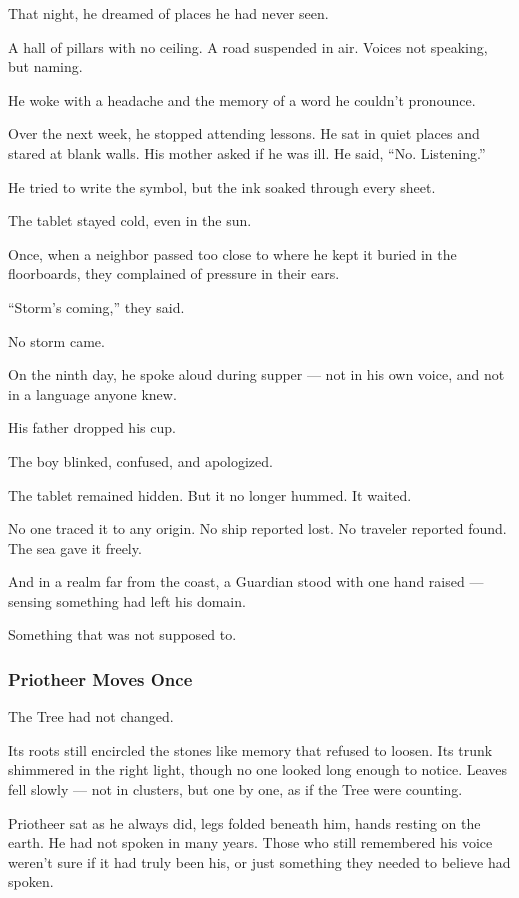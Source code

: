 \documentclass[12pt]{article}
\begin{document}
That night, he dreamed of places he had never seen.

A hall of pillars with no ceiling. A road suspended in air. Voices not speaking, but naming.

He woke with a headache and the memory of a word he couldn’t pronounce.

Over the next week, he stopped attending lessons. He sat in quiet places and stared at blank walls. His mother asked if he was ill. He said, ``No. Listening.''

He tried to write the symbol, but the ink soaked through every sheet.

The tablet stayed cold, even in the sun.

Once, when a neighbor passed too close to where he kept it buried in the floorboards, they complained of pressure in their ears.

``Storm’s coming,'' they said.

No storm came.

On the ninth day, he spoke aloud during supper — not in his own voice, and not in a language anyone knew.

His father dropped his cup.

The boy blinked, confused, and apologized.

The tablet remained hidden. But it no longer hummed. It waited.

No one traced it to any origin. No ship reported lost. No traveler reported found. The sea gave it freely.

And in a realm far from the coast, a Guardian stood with one hand raised — sensing something had left his domain.

Something that was not supposed to.


\dotfill

\subsubsection{Priotheer Moves Once}

The Tree had not changed.

Its roots still encircled the stones like memory that refused to loosen. Its trunk shimmered in the right light, though no one looked long enough to notice. Leaves fell slowly — not in clusters, but one by one, as if the Tree were counting.

Priotheer sat as he always did, legs folded beneath him, hands resting on the earth. He had not spoken in many years. Those who still remembered his voice weren’t sure if it had truly been his, or just something they needed to believe had spoken.
\end{document}
